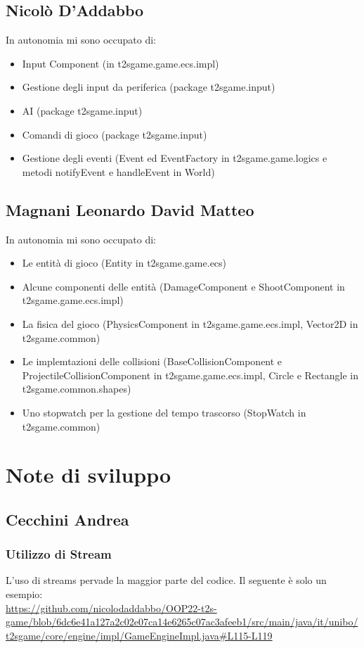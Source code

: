 \documentclass[a4paper,12pt]{report}
\begin{document}
\subsection*{Nicolò D'Addabbo}
In autonomia mi sono occupato di:
\begin{itemize}
\item Input Component (in t2sgame.game.ecs.impl)
\item Gestione degli input da periferica (package t2sgame.input)
\item AI (package t2sgame.input)
\item Comandi di gioco (package t2sgame.input)
\item Gestione degli eventi (Event ed EventFactory in t2sgame.game.logics e metodi notifyEvent e handleEvent in World)
\end{itemize}

\subsection*{Magnani Leonardo David Matteo}
In autonomia mi sono occupato di:
\begin{itemize}
\item Le entità di gioco (Entity in t2sgame.game.ecs)
\item Alcune componenti delle entità (DamageComponent e ShootComponent in t2sgame.game.ecs.impl)
\item La fisica del gioco (PhysicsComponent in t2sgame.game.ecs.impl, Vector2D in  t2sgame.common)
\item Le implemtazioni delle collisioni (BaseCollisionComponent e ProjectileCollisionComponent in t2sgame.game.ecs.impl, Circle e Rectangle in t2sgame.common.shapes)
\item Uno stopwatch per la gestione del tempo trascorso (StopWatch in t2sgame.common)
\end{itemize}

\section{Note di sviluppo}
\subsection*{Cecchini Andrea}
\subsubsection*{Utilizzo di Stream}
L'uso di streams pervade la maggior parte del codice.
Il seguente è solo un esempio: 
\\
\url{https://github.com/nicolodaddabbo/OOP22-t2s-game/blob/6dc6e41a127a2c02e07ca14e6265c07ac3afeeb1/src/main/java/it/unibo/t2sgame/core/engine/impl/GameEngineImpl.java#L115-L119}
\end{document}
